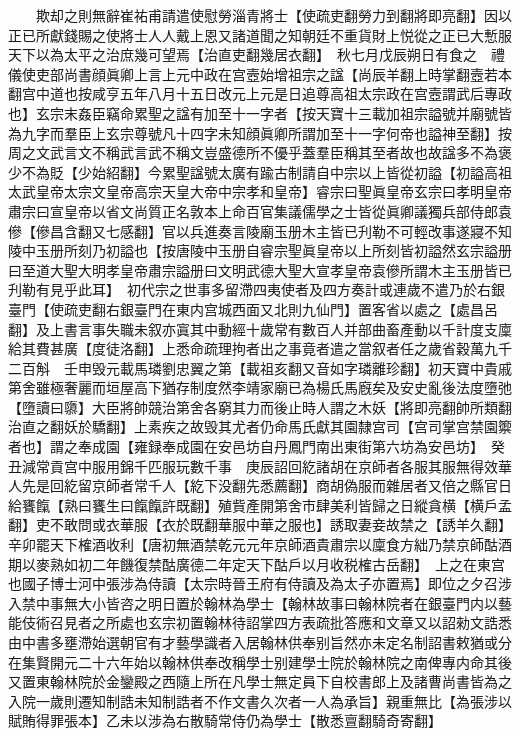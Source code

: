 　　欺却之則無辭崔祐甫請遣使慰勞淄青將士【使疏吏翻勞力到翻將即亮翻】因以正已所獻錢賜之使將士人人戴上恩又諸道聞之知朝廷不重貨財上悦從之正已大慙服天下以為太平之治庶幾可望焉【治直吏翻幾居衣翻】　秋七月戊辰朔日有食之　禮儀使吏部尚書顔眞卿上言上元中政在宫壼始增祖宗之諡【尚辰羊翻上時掌翻壼若本翻宫中道也按咸亨五年八月十五日改元上元是日追尊高祖太宗政在宫壼謂武后專政也】玄宗末姦臣竊命累聖之諡有加至十一字者【按天寶十三載加祖宗謚號并廟號皆為九字而羣臣上玄宗尊號凡十四字未知顔眞卿所謂加至十一字何帝也謚神至翻】按周之文武言文不稱武言武不稱文豈盛德所不優乎蓋羣臣稱其至者故也故諡多不為褒少不為貶【少始紹翻】今累聖諡號太廣有踰古制請自中宗以上皆從初謚【初謚高祖太武皇帝太宗文皇帝高宗天皇大帝中宗孝和皇帝】睿宗曰聖眞皇帝玄宗曰孝明皇帝肅宗曰宣皇帝以省文尚質正名敦本上命百官集議儒學之士皆從眞卿議獨兵部侍郎袁傪【傪昌含翻又七感翻】官以兵進奏言陵廟玉册木主皆已刋勒不可輕改事遂寢不知陵中玉册所刻乃初謚也【按唐陵中玉册自睿宗聖眞皇帝以上所刻皆初謚然玄宗謚册曰至道大聖大明孝皇帝肅宗謚册曰文明武德大聖大宣孝皇帝袁傪所謂木主玉册皆已刋勒有見乎此耳】　初代宗之世事多留滯四夷使者及四方奏計或連歲不遣乃於右銀臺門【使疏吏翻右銀臺門在東内宫城西面又北則九仙門】置客省以處之【處昌呂翻】及上書言事失職未叙亦寘其中動經十歲常有數百人并部曲畜產動以千計度支廩給其費甚廣【度徒洛翻】上悉命疏理拘者出之事竟者遣之當叙者任之歲省穀萬九千二百斛　壬申毁元載馬璘劉忠翼之第【載祖亥翻又音如字璘離珍翻】初天寶中貴戚第舍雖極奢麗而垣屋高下猶存制度然李靖家廟已為楊氏馬廐矣及安史亂後法度墮弛【墮讀曰隳】大臣將帥競治第舍各窮其力而後止時人謂之木妖【將即亮翻帥所類翻治直之翻妖於驕翻】上素疾之故毁其尤者仍命馬氏獻其園隸宫司【宫司掌宫禁園籞者也】謂之奉成園【雍録奉成園在安邑坊自丹鳳門南出東街第六坊為安邑坊】　癸丑減常貢宫中服用錦千匹服玩數千事　庚辰詔回紇諸胡在京師者各服其服無得效華人先是回紇留京師者常千人【紇下没翻先悉薦翻】商胡偽服而雜居者又倍之縣官日給饔餼【熟曰饔生曰餼餼許既翻】殖貲產開第舍市肆美利皆歸之日縱貪横【横戶孟翻】吏不敢問或衣華服【衣於既翻華服中華之服也】誘取妻妾故禁之【誘羊久翻】　辛卯罷天下榷酒收利【唐初無酒禁乾元元年京師酒貴肅宗以廩食方絀乃禁京師酤酒期以麥熟如初二年饑復禁酤廣德二年定天下酤戶以月收税榷古岳翻】　上之在東宫也國子博士河中張涉為侍讀【太宗時晉王府有侍讀及為太子亦置焉】即位之夕召涉入禁中事無大小皆咨之明日置於翰林為學士【翰林故事曰翰林院者在銀臺門内以藝能伎術召見者之所處也玄宗初置翰林待詔掌四方表疏批答應和文章又以詔勑文誥悉由中書多壅滯始選朝官有才藝學識者入居翰林供奉别旨然亦未定名制詔書敕猶或分在集賢開元二十六年始以翰林供奉改稱學士别建學士院於翰林院之南俾專内命其後又置東翰林院於金鑾殿之西隨上所在凡學士無定員下自校書郎上及諸曹尚書皆為之入院一歲則遷知制誥未知制誥者不作文書久次者一人為承旨】親重無比【為張涉以賦賄得罪張本】乙未以涉為右散騎常侍仍為學士【散悉亶翻騎奇寄翻】

